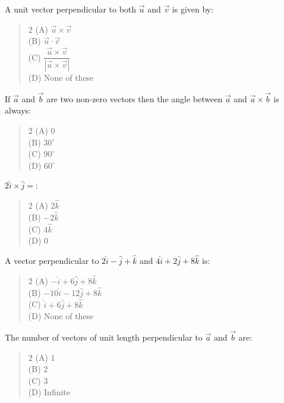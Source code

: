 \documentclass[11pt,a4paper]{article}
\begin{document}
\begin{mcqlist}
\item A unit vector perpendicular to both $\vec{u}$ and $\vec{v}$ is given by:
\begin{quote}\begin{multicols}{2}
\noindent (A) $\vec{u}\times\vec{v}$ \\
(B) $\vec{u}\cdot\vec{v}$ \\
(C) $\dfrac{\vec{u}\times\vec{v}}{|\vec{u}\times\vec{v}|}$ \\
(D) None of these
\end{multicols}\end{quote}

\item If $\vec{a}$ and $\vec{b}$ are two non-zero vectors then the angle between $\vec{a}$ and $\vec{a}\times\vec{b}$ is always:
\begin{quote}\begin{multicols}{2}
\noindent (A) $0$ \\
(B) $30^\circ$ \\
(C) $90^\circ$ \\
(D) $60^\circ$
\end{multicols}\end{quote}

\item $2\hat{i}\times\hat{j}=$:
\begin{quote}\begin{multicols}{2}
\noindent (A) $2\hat{k}$ \\
(B) $-2\hat{k}$ \\
(C) $4\hat{k}$ \\
(D) $0$
\end{multicols}\end{quote}

\item A vector perpendicular to $2\hat{i}-\hat{j}+\hat{k}$ and $4\hat{i}+2\hat{j}+8\hat{k}$ is:
\begin{quote}\begin{multicols}{2}
\noindent (A) $-\hat{i}+6\hat{j}+8\hat{k}$ \\
(B) $-10\hat{i}-12\hat{j}+8\hat{k}$ \\
(C) $\hat{i}+6\hat{j}+8\hat{k}$ \\
(D) None of these
\end{multicols}\end{quote}

\item The number of vectors of unit length perpendicular to $\vec{a}$ and $\vec{b}$ are:
\begin{quote}\begin{multicols}{2}
\noindent (A) $1$ \\
(B) $2$ \\
(C) $3$ \\
(D) Infinite
\end{multicols}\end{quote}


\end{mcqlist}
\end{document}
